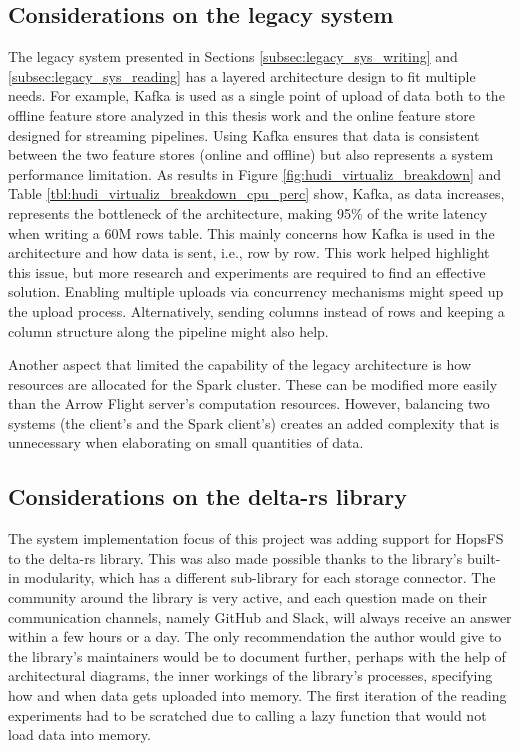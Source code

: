 \subsection{Considerations on the legacy system}

The legacy system presented in Sections \ref{subsec:legacy_sys_writing} and \ref{subsec:legacy_sys_reading} has a layered architecture design to fit multiple needs. For example, Kafka is used as a single point of upload of data both to the offline feature store analyzed in this thesis work and the online feature store designed for streaming pipelines. Using Kafka ensures that data is consistent between the two feature stores (online and offline) but also represents a system performance limitation. As results in Figure \ref{fig:hudi_virtualiz_breakdown} and Table \ref{tbl:hudi_virtualiz_breakdown_cpu_perc} show, Kafka, as data increases, represents the bottleneck of the architecture, making 95\% of the write latency when writing a 60M rows table. This mainly concerns how Kafka is used in the architecture and how data is sent, i.e., row by row. 
This work helped highlight this issue, but more research and experiments are required to find an effective solution. Enabling multiple uploads via concurrency mechanisms might speed up the upload process. Alternatively, sending columns instead of rows and keeping a column structure along the pipeline might also help. 

Another aspect that limited the capability of the legacy architecture is how resources are allocated for the Spark cluster. These can be modified more easily than the Arrow Flight server's computation resources. However, balancing two systems (the client's and the Spark client's) creates an added complexity that is unnecessary when elaborating on small quantities of data.

\subsection{Considerations on the delta-rs library}

The system implementation focus of this project was adding support for \gls{HopsFS} to the delta-rs library. This was also made possible thanks to the library's built-in modularity, which has a different sub-library for each storage connector. The community around the library is very active, and each question made on their communication channels, namely GitHub and Slack, will always receive an answer within a few hours or a day. The only recommendation the author would give to the library's maintainers would be to document further, perhaps with the help of architectural diagrams, the inner workings of the library's processes, specifying how and when data gets uploaded into memory. The first iteration of the reading experiments had to be scratched due to calling a lazy function that would not load data into memory. 

